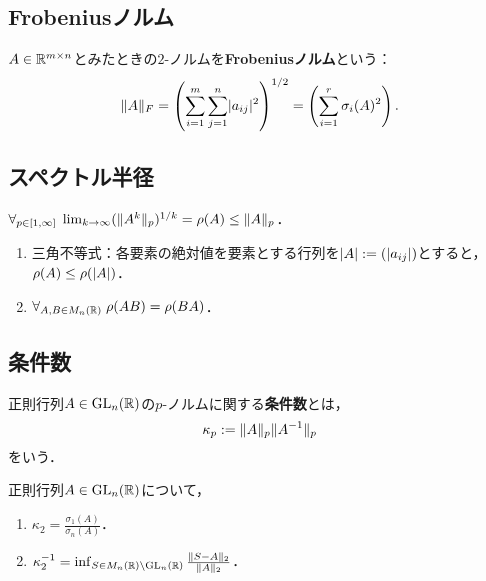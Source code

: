 \documentclass[uplatex, dvipdfmx]{jsreport}
\begin{document}
\subsection{Frobeniusノルム}

\begin{definition}
    $A\in\mathbb{R}^{m\times n}$とみたときの$2$-ノルムを\textbf{Frobeniusノルム}という：
    \[\|A\|_F=\left(\sum^m_{i=1}\sum^n_{j=1}\lvert a_{ij}\rvert^2\right)^{1/2}=\left(\sum_{i=1}^r\sigma_i(A)^2\right).\]
\end{definition}

\subsection{スペクトル半径}

\begin{proposition}[スペクトル半径公式]
    $\forall_{p\in[1,\infty]}\;\lim_{k\to\infty}(\|A^k\|_p)^{1/k}=\rho(A)\le\|A\|_p$．
\end{proposition}

\begin{lemma}\mbox{}
    \begin{enumerate}
        \item 三角不等式：各要素の絶対値を要素とする行列を$\lvert A\rvert:=(\lvert a_{ij}\rvert)$とすると，$\rho(A)\le\rho(\lvert A\rvert)$．
        \item $\forall_{A,B\in M_n(\mathbb{R})}\;\rho(AB)=\rho(BA)$．
    \end{enumerate}
\end{lemma}

\subsection{条件数}

\begin{definition}
    正則行列$A\in\mathrm{GL}_n(\mathbb{R})$の$p$-ノルムに関する\textbf{条件数}とは，
    \[\kappa_p:=\|A\|_p\|A^{-1}\|_p\]
    をいう．
\end{definition}

\begin{lemma}
    正則行列$A\in\mathrm{GL}_n(\mathbb{R})$について，
    \begin{enumerate}
        \item $\kappa_2=\frac{\sigma_1(A)}{\sigma_n(A)}$．
        \item $\kappa_2^{-1}=\inf_{S\in M_n(\mathbb{R})\setminus\mathrm{GL}_n(\mathbb{R})}\frac{\|S-A\|_2}{\|A\|_2}$．
    \end{enumerate}
\end{lemma}
\end{document}
